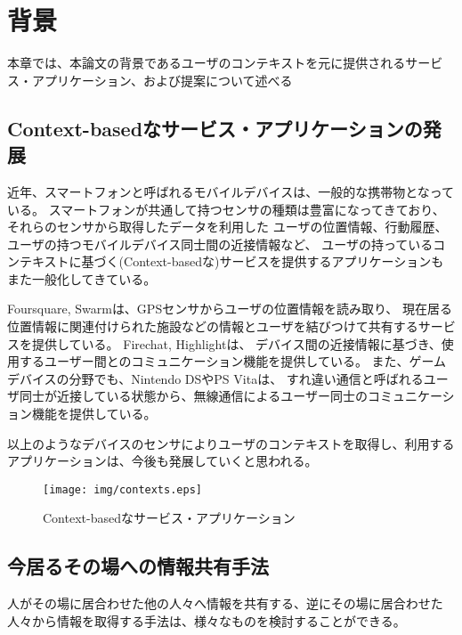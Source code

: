 \chapter{背景}\label{chap:background}

本章では、本論文の背景であるユーザのコンテキストを元に提供されるサービス・アプリケーション、および提案について述べる

\newpage


\section{Context-basedなサービス・アプリケーションの発展}

近年、スマートフォンと呼ばれるモバイルデバイスは、一般的な携帯物となっている。
スマートフォンが共通して持つセンサの種類は豊富になってきており、それらのセンサから取得したデータを利用した
ユーザの位置情報、行動履歴、ユーザの持つモバイルデバイス同士間の近接情報など、
ユーザの持っているコンテキストに基づく(Context-basedな)サービスを提供するアプリケーションもまた一般化してきている。

Foursquare\cite{foursquare}, Swarm\cite{swarm}は、GPSセンサからユーザの位置情報を読み取り、
現在居る位置情報に関連付けられた施設などの情報とユーザを結びつけて共有するサービスを提供している。
Firechat\cite{firechat}, Highlight\cite{highlight}は、
デバイス間の近接情報に基づき、使用するユーザー間とのコミュニケーション機能を提供している。
また、ゲームデバイスの分野でも、Nintendo DS\cite{3ds}やPS Vita\cite{vita}は、
すれ違い通信と呼ばれるユーザ同士が近接している状態から、無線通信によるユーザー同士のコミュニケーション機能を提供している。

以上のようなデバイスのセンサによりユーザのコンテキストを取得し、利用するアプリケーションは、今後も発展していくと思われる。

\begin{figure}[h]
    \begin{center}
        \texttt{[image: img/contexts.eps]}
    \end{center}
    \caption{Context-basedなサービス・アプリケーション}
    \label{fig:contexts}
\end{figure}


\section{今居るその場への情報共有手法}

人がその場に居合わせた他の人々へ情報を共有する、逆にその場に居合わせた人々から情報を取得する手法は、様々なものを検討することができる。

